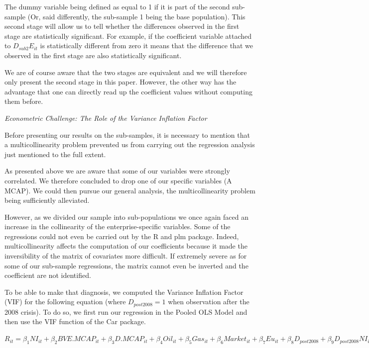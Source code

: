\documentclass[a4paper]{article}
\begin{document}
The dummy variable being defined as equal to 1 if it is part of the second sub-sample (Or, said differently, the sub-sample 1 being the base population). This second stage will allow us to tell whether the differences observed in the first stage are statistically significant. For example, if the coefficient variable attached to $D_{sub2}E_{it}$ is statistically different from zero it means that the difference that we observed in the first stage are also statistically significant. 

We are of course aware that the two stages are equivalent and we will therefore only present the second stage in this paper. However, the other way has the advantage that one can directly read up the coefficient values without computing them before. 

\emph{Econometric Challenge: The Role of the Variance Inflation Factor}

Before presenting our results on the sub-samples, it is necessary to mention that a multicollinearity problem prevented us from carrying out the regression analysis just mentioned to the full extent.

As presented above we are aware that some of our variables were strongly correlated. We therefore concluded to drop one of our specific variables (A MCAP). We could then pursue our general analysis, the multicollinearity problem being sufficiently alleviated. 

However, as we divided our sample into sub-populations we once again faced an increase in the collinearity of the enterprise-specific variables. Some of the regressions could not even be carried out by the R and plm package. Indeed, multicollinearity affects the computation of our coefficients because it made the inversibility of the matrix of covariates more difficult. If extremely severe as for some of our sub-sample regressions, the matrix cannot even be inverted and the coefficient are not identified. 

To be able to make that diagnosis, we computed the Variance Inflation Factor (VIF) for the following equation (where $D_{post2008}=1$ when observation after the 2008 crisis). To do so, we first run our regression in the Pooled OLS Model and then use the VIF function of the Car package. 

$R_{it} = \beta_{1} NI_{it} + \beta_{2} BVE.MCAP_{it} + \beta_{3} D.MCAP_{it} + \beta_4Oil_{it} + \beta_{5} Gas_{it} + \beta_{6} Market_{it} + \beta_{7} Eu_{it} + \beta_{8} D_{post2008} + \beta_{9} D_{post2008} NI_{it} + \beta_{10} D_{post2008} BVE.MCAP_{it} + \beta_{11} D_{post2008}D.MCAP_{it} + \beta_{12} D_{post2008} Oil_{it} + \beta_{13} D_{post2008} Gas_{it} + \beta_{14} D_{post2008} Market_{it} + \mu_i + \epsilon_{it}$
\end{document}
